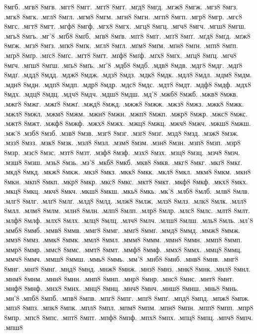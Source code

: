 {8мгб.
.мгв8
8мгв.
.мгг8
8мгг.
.мгґ8
8мгґ.
.мгд8
8мгд.
.мгж8
8мгж.
.мгз8
8мгз.
.мгк8
8мгк.
.мгл8
8мгл.
.мгм8
8мгм.
.мгн8
8мгн.
.мгп8
8мгп.
.мгр8
8мгр.
.мгс8
8мгс.
.мгт8
8мгт.
.мгф8
8мгф.
.мгх8
8мгх.
.мгц8
8мгц.
.мгч8
8мгч.
.мгш8
8мгш.
.мгь8
8мгь.
.мг'8
.мґб8
8мґб.
.мґв8
8мґв.
.мґг8
8мґг.
.мґґ8
8мґґ.
.мґд8
8мґд.
.мґж8
8мґж.
.мґз8
8мґз.
.мґк8
8мґк.
.мґл8
8мґл.
.мґм8
8мґм.
.мґн8
8мґн.
.мґп8
8мґп.
.мґр8
8мґр.
.мґс8
8мґс.
.мґт8
8мґт.
.мґф8
8мґф.
.мґх8
8мґх.
.мґц8
8мґц.
.мґч8
8мґч.
.мґш8
8мґш.
.мґь8
8мґь.
.мґ'8
.мдб8
8мдб.
.мдв8
8мдв.
.мдг8
8мдг.
.мдґ8
8мдґ.
.мдд8
8мдд.
.мдж8
8мдж.
.мдз8
8мдз.
.мдк8
8мдк.
.мдл8
8мдл.
.мдм8
8мдм.
.мдн8
8мдн.
.мдп8
8мдп.
.мдр8
8мдр.
.мдс8
8мдс.
.мдт8
8мдт.
.мдф8
8мдф.
.мдх8
8мдх.
.мдц8
8мдц.
.мдч8
8мдч.
.мдш8
8мдш.
.мд'8
.мжб8
8мжб.
.мжв8
8мжв.
.мжг8
8мжг.
.мжґ8
8мжґ.
.мжд8
8мжд.
.мжж8
8мжж.
.мжз8
8мжз.
.мжк8
8мжк.
.мжл8
8мжл.
.мжм8
8мжм.
.мжн8
8мжн.
.мжп8
8мжп.
.мжр8
8мжр.
.мжс8
8мжс.
.мжт8
8мжт.
.мжф8
8мжф.
.мжх8
8мжх.
.мжц8
8мжц.
.мжч8
8мжч.
.мжш8
8мжш.
.мж'8
.мзб8
8мзб.
.мзв8
8мзв.
.мзг8
8мзг.
.мзґ8
8мзґ.
.мзд8
8мзд.
.мзж8
8мзж.
.мзз8
8мзз.
.мзк8
8мзк.
.мзл8
8мзл.
.мзм8
8мзм.
.мзн8
8мзн.
.мзп8
8мзп.
.мзр8
8мзр.
.мзс8
8мзс.
.мзт8
8мзт.
.мзф8
8мзф.
.мзх8
8мзх.
.мзц8
8мзц.
.мзч8
8мзч.
.мзш8
8мзш.
.мзь8
8мзь.
.мз'8
.мкб8
8мкб.
.мкв8
8мкв.
.мкг8
8мкг.
.мкґ8
8мкґ.
.мкд8
8мкд.
.мкж8
8мкж.
.мкз8
8мкз.
.мкк8
8мкк.
.мкл8
8мкл.
.мкм8
8мкм.
.мкн8
8мкн.
.мкп8
8мкп.
.мкр8
8мкр.
.мкс8
8мкс.
.мкт8
8мкт.
.мкф8
8мкф.
.мкх8
8мкх.
.мкц8
8мкц.
.мкч8
8мкч.
.мкш8
8мкш.
.мкь8
8мкь.
.мк'8
.млб8
8млб.
.млв8
8млв.
.млг8
8млг.
.млґ8
8млґ.
.млд8
8млд.
.млж8
8млж.
.млз8
8млз.
.млк8
8млк.
.млл8
8млл.
.млм8
8млм.
.млн8
8млн.
.млп8
8млп.
.млр8
8млр.
.млс8
8млс.
.млт8
8млт.
.млф8
8млф.
.млх8
8млх.
.млц8
8млц.
.млч8
8млч.
.млш8
8млш.
.мль8
8мль.
.мл'8
.ммб8
8ммб.
.ммв8
8ммв.
.ммг8
8ммг.
.ммґ8
8ммґ.
.ммд8
8ммд.
.ммж8
8ммж.
.ммз8
8ммз.
.ммк8
8ммк.
.ммл8
8ммл.
.ммм8
8ммм.
.ммн8
8ммн.
.ммп8
8ммп.
.ммр8
8ммр.
.ммс8
8ммс.
.ммт8
8ммт.
.ммф8
8ммф.
.ммх8
8ммх.
.ммц8
8ммц.
.ммч8
8ммч.
.ммш8
8ммш.
.ммь8
8ммь.
.мм'8
.мнб8
8мнб.
.мнв8
8мнв.
.мнг8
8мнг.
.мнґ8
8мнґ.
.мнд8
8мнд.
.мнж8
8мнж.
.мнз8
8мнз.
.мнк8
8мнк.
.мнл8
8мнл.
.мнм8
8мнм.
.мнн8
8мнн.
.мнп8
8мнп.
.мнр8
8мнр.
.мнс8
8мнс.
.мнт8
8мнт.
.мнф8
8мнф.
.мнх8
8мнх.
.мнц8
8мнц.
.мнч8
8мнч.
.мнш8
8мнш.
.мнь8
8мнь.
.мн'8
.мпб8
8мпб.
.мпв8
8мпв.
.мпг8
8мпг.
.мпґ8
8мпґ.
.мпд8
8мпд.
.мпж8
8мпж.
.мпз8
8мпз.
.мпк8
8мпк.
.мпл8
8мпл.
.мпм8
8мпм.
.мпн8
8мпн.
.мпп8
8мпп.
.мпр8
8мпр.
.мпс8
8мпс.
.мпт8
8мпт.
.мпф8
8мпф.
.мпх8
8мпх.
.мпц8
8мпц.
.мпч8
8мпч.
.мпш8
}
